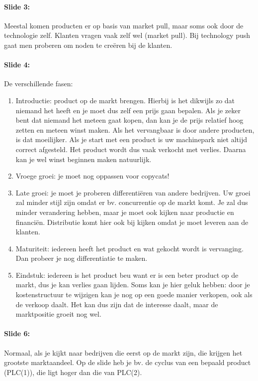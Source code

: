 \documentclass[10pt,a4paper]{report}
\begin{document}
\paragraph{Slide 3:} Meestal komen producten er op basis van market pull, maar soms ook door de technologie zelf. Klanten vragen vaak zelf wel (market pull). Bij technology push gaat men proberen om noden te cre\"eren bij de klanten.

\paragraph{Slide 4:} De verschillende fasen: 
\begin{enumerate}
\item Introductie: product op de markt brengen. Hierbij is het dikwijls zo dat niemand het heeft en je moet dus zelf een prijs gaan bepalen. Als je zeker bent dat niemand het meteen gaat kopen, dan kan je de prijs relatief hoog zetten en meteen winst maken. Als het vervangbaar is door andere producten, is dat moeilijker. Als je start met een product is uw machinepark niet altijd correct afgesteld. Het product wordt dus vaak verkocht met verlies. Daarna kan je wel winst beginnen maken natuurlijk. 
\item Vroege groei: je moet nog oppassen voor copycats! 
\item Late groei: je moet je proberen differenti\"eren van andere bedrijven. Uw groei zal minder stijl zijn omdat er bv. concurrentie op de markt komt. Je zal dus minder verandering hebben, maar je moet ook kijken naar productie en financi\"en. Distributie komt hier ook bij kijken omdat je moet leveren aan de klanten.
\item Maturiteit: iedereen heeft het product en wat gekocht wordt is vervanging. Dan probeer je nog differentiatie te maken.
\item Eindstuk: iedereen is het product beu want er is een beter product op de markt, dus je kan verlies gaan lijden. Soms kan je hier geluk hebben: door je kostenstructuur te wijzigen kan je nog op een goede manier verkopen, ook als de verkoop daalt. Het kan dus zijn dat de interesse daalt, maar de marktpositie groeit nog wel.
\end{enumerate}

\paragraph{Slide 6:} Normaal, als je kijkt naar bedrijven die eerst op de markt zijn, die krijgen het grootste marktaandeel. Op de slide heb je bv. de cyclus van een bepaald product (PLC(1)), die ligt hoger dan die van PLC(2). 
\end{document}
